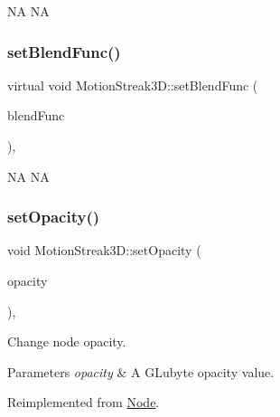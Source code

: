 NA  NA \mbox{\label{classMotionStreak3D_a80ee5d8b98847fff388cff81997818d0}} 
\subsubsection{\texorpdfstring{set\+Blend\+Func()}{setBlendFunc()}\hspace{0.1cm}{\footnotesize\ttfamily [2/2]}}
{\footnotesize\ttfamily virtual void Motion\+Streak3\+D\+::set\+Blend\+Func (\begin{DoxyParamCaption}\item[{const \hyperlink{structBlendFunc}{Blend\+Func} \&}]{blend\+Func }\end{DoxyParamCaption})\hspace{0.3cm}{\ttfamily [override]}, {\ttfamily [virtual]}}

NA  NA \mbox{\label{classMotionStreak3D_aebd12e84f982bb11ab3cc3c92e769f73}} 
\subsubsection{\texorpdfstring{set\+Opacity()}{setOpacity()}\hspace{0.1cm}{\footnotesize\ttfamily [1/2]}}
{\footnotesize\ttfamily void Motion\+Streak3\+D\+::set\+Opacity (\begin{DoxyParamCaption}\item[{G\+Lubyte}]{opacity }\end{DoxyParamCaption})\hspace{0.3cm}{\ttfamily [override]}, {\ttfamily [virtual]}}

Change node opacity. 
\begin{DoxyParams}{Parameters}
{\em opacity} & A G\+Lubyte opacity value. \\
\hline
\end{DoxyParams}


Reimplemented from \hyperlink{classNode_ae41a9db63bfa3d466ee7c9d79c35352d}{Node}.

\mbox{\label{classMotionStreak3D_aaf983644b09cefdf815a650c7cfd426a}} 
